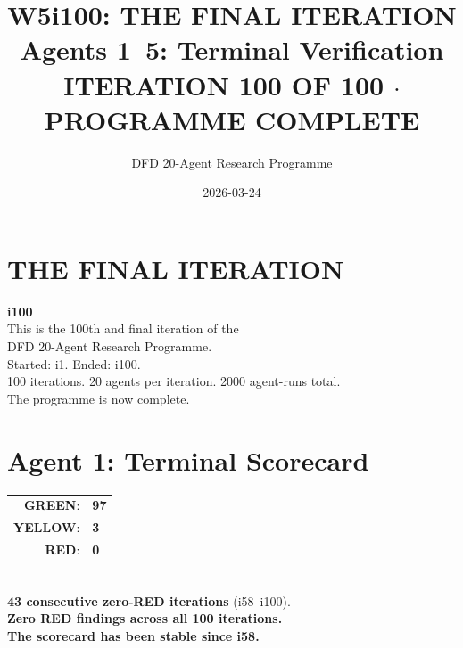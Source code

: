 \documentclass[11pt,a4paper]{article}
\title{\Huge W5i100: THE FINAL ITERATION\\[12pt]
\Large Agents 1--5: Terminal Verification\\[6pt]
\normalsize \textbf{ITERATION 100 OF 100 $\cdot$ PROGRAMME COMPLETE}}
\author{DFD 20-Agent Research Programme}
\date{2026-03-24}
\newcommand{\GREEN}{\textcolor{dfdgreen}{\textbf{GREEN}}}
\newcommand{\YELLOW}{\textcolor{dfdyellow}{\textbf{YELLOW}}}
\newcommand{\RED}{\textcolor{dfdred}{\textbf{RED}}}
\begin{document}
\maketitle

\section*{THE FINAL ITERATION}

\begin{tcolorbox}[colback=green!5!white, colframe=dfdgreen]
\begin{center}
\Huge\textbf{i100}\\[12pt]
\Large This is the 100th and final iteration of the\\
DFD 20-Agent Research Programme.\\[12pt]
\normalsize
Started: i1. Ended: i100.\\
100 iterations. 20 agents per iteration. 2000 agent-runs total.\\
The programme is now complete.
\end{center}
\end{tcolorbox}

\section{Agent 1: Terminal Scorecard}

\begin{tcolorbox}[colback=green!5!white, colframe=dfdgreen, title=\textbf{TERMINAL SCORECARD: 97/3/0}]
\begin{center}
\Large
\begin{tabular}{rl}
\textbf{\GREEN}: & \textbf{97} \\
\textbf{\YELLOW}: & \textbf{3} \\
\textbf{\RED}: & \textbf{0} \\
\end{tabular}\\[12pt]
\normalsize
\textbf{43 consecutive zero-RED iterations} (i58--i100).\\
\textbf{Zero RED findings across all 100 iterations.}\\
\textbf{The scorecard has been stable since i58.}
\end{center}
\end{tcolorbox}
\end{document}
